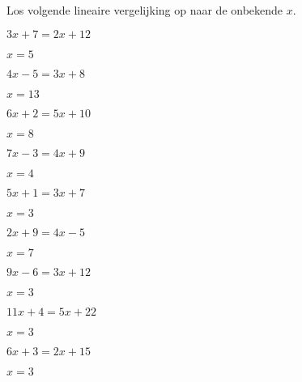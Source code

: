 \documentclass{ximera}
\begin{document}
	\author{Wiskunde Op Maat}

\begin{exercise} Los volgende lineaire vergelijking op naar de onbekende \(x\).
\begin{xmmulticols}
  
  \begin{question} \( 3x + 7  =  2x + 12    \) \begin{uitkomst} \( x  = 5  \) \end{uitkomst} \end{question}
  \begin{question} \( 4x - 5  =  3x + 8     \) \begin{uitkomst} \( x  = 13 \) \end{uitkomst} \end{question}
  \begin{question} \( 6x + 2  =  5x + 10    \) \begin{uitkomst} \( x  = 8  \) \end{uitkomst} \end{question}
  \begin{question} \( 7x - 3  =  4x + 9     \) \begin{uitkomst} \( x  = 4  \) \end{uitkomst} \end{question}
  \begin{question} \( 5x + 1  =  3x + 7     \) \begin{uitkomst} \( x  = 3  \) \end{uitkomst} \end{question}
  \begin{question} \( 2x + 9  =  4x - 5     \) \begin{uitkomst} \( x  = 7  \) \end{uitkomst} \end{question}
  \begin{question} \( 9x - 6  =  3x + 12    \) \begin{uitkomst} \( x  = 3  \) \end{uitkomst} \end{question}
  \begin{question} \( 11x + 4 =  5x + 22    \) \begin{uitkomst} \( x  = 3  \) \end{uitkomst} \end{question}
  \begin{question} \( 6x + 3  =  2x + 15    \) \begin{uitkomst} \( x  = 3  \) \end{uitkomst} \end{question}

\end{xmmulticols}
\end{exercise}
\end{document}
